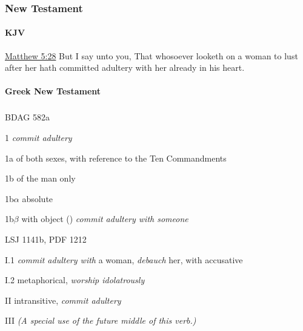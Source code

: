 	\subsubsection{New Testament} %
		\label{ADULTERY-NT}
	
		\paragraph{KJV}
			\label{ADULTERY-NT-KJV}
			
	
			
			\begin{compactdesc}
				\item[{\hyperref[MATTHEW-5-28]{Matthew 5:28}}] But I say unto you, That whosoever looketh on a woman to lust after her hath committed adultery with her already in his heart.
			\end{compactdesc}
			
		\paragraph{Greek New Testament} %
			\label{ADULTERY-GREEK}
		
			\subparagraph{\texorpdfstring{}{}}
				\label{MOICHEUO}
			
				\begin{compactdesc}
					\item[BDAG 582a] \textbf{}
						\begin{compactitem}
							\item[1] \textit{commit adultery}
							\item[1a] of both sexes, with reference to the Ten Commandments
							\item[1b] of the man only
							\item[1b$\alpha$] absolute
							\item[1b$\beta$] with object  () \textit{commit adultery with someone}
						\end{compactitem}
					\item[LSJ 1141b, PDF 1212] \textbf{}
						\begin{compactitem}
							\item[I.1] \textit{commit adultery with} a woman, \textit{debauch} her, with accusative
							\item[I.2] metaphorical, \textit{worship idolatrously}
							\item[II] intransitive, \textit{commit adultery}
							\item[III] \textit{(A special use of the future middle of this verb.)}
						\end{compactitem}
				\end{compactdesc}
				
